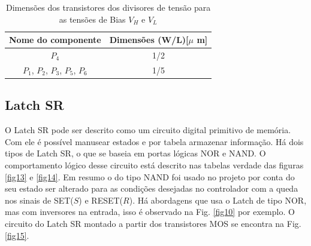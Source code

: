 \begin{table}[htb]
\centering
\begin{tabular}{c|c}
\hline 
\hline 
\textbf{Nome do componente} & \textbf{Dimensões (W/L)[$\mu$ m]} \\ 
\hline 
\hline 
$P_4$ & 1/2 \\ 
\hline 
$P_1$, $P_2$, $P_3$, $P_5$, $P_6$  & 1/5 \\ 
\hline 
\end{tabular} 
\caption{Dimensões dos transistores dos divisores de tensão para as tensões de Bias $V_H$ e $V_L$}
\label{tab:control}
\end{table}

\subsection{Latch SR}

O Latch SR pode ser descrito como um circuito digital primitivo de memória. Com ele é possível manusear estados e por tabela armazenar informação. Há dois tipos de Latch SR, o que se baseia em portas lógicas NOR e NAND.
O comportamento lógico desse circuito está descrito nas tabelas verdade das figuras \ref{fig13} e \ref{fig14}. Em resumo o do tipo NAND foi usado no projeto por conta do seu estado ser alterado para as condições desejadas no controlador com a queda nos sinais de SET($S$) e RESET($R$). Há abordagens que usa o Latch de tipo NOR, mas com inversores na entrada, isso é observado na Fig. \ref{fig10} por exemplo. 
O circuito do Latch SR montado a partir dos transistores MOS se encontra na Fig. \ref{fig15}. 

